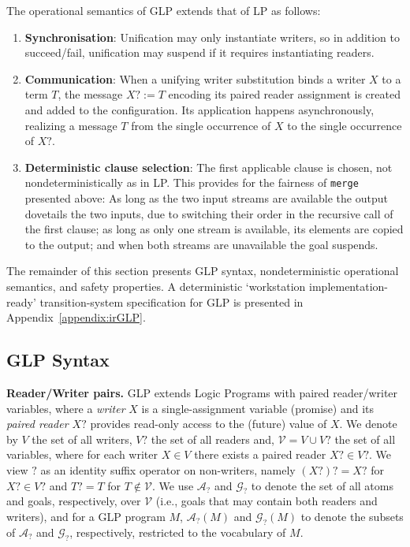 \documentclass[runningheads,thm-restate]{llncs}
\newcommand{\mypara}[1]{\smallskip\noindent\textbf{#1.}}
\newcommand{\calV}{\mathcal{V}}
\newcommand{\calG}{\mathcal{G}}
\newcommand{\calA}{\mathcal{A}}
\begin{document}
The operational semantics of GLP extends that of LP as follows:
\begin{enumerate}
\item \textbf{Synchronisation}: Unification may only instantiate writers, so in addition to succeed/fail, unification may suspend if it requires instantiating readers.

\item \textbf{Communication}: When a unifying writer substitution binds a writer $X$ to a term $T$, the message  $X? := T$ encoding its paired reader assignment is created and added to the configuration. Its application happens asynchronously, realizing a message $T$ from the single occurrence of $X$ to the single occurrence of $X?$. 

\item \textbf{Deterministic clause selection}: The first applicable clause is chosen, not nondeterministically as in LP. This provides for the fairness of \verb|merge| presented above:  As long as the two input streams are available the output dovetails the two inputs, due to switching their order in the recursive call of the first clause; as long as only one stream is available, its elements are copied to the output; and when both streams are unavailable the goal suspends.
\end{enumerate}

The remainder of this section presents GLP syntax, nondeterministic operational semantics, and safety properties. A deterministic `workstation implementation-ready' transition-system specification for GLP is presented in Appendix~\ref{appendix:irGLP}. 

\subsection{GLP Syntax}

\mypara{Reader/Writer pairs}
GLP extends Logic Programs with paired reader/writer variables, where a \emph{writer} $X$ is a single-assignment variable (promise) and its \emph{paired reader $X?$} provides read-only access to the (future) value of $X$. We denote by $V$ the set of all writers, $V?$ the set of all readers and, $\mathcal{V} = V \cup V?$ the set of all variables, where for each writer $X \in V$ there exists a paired reader $X? \in V?$.  
We view $?$ as an identity suffix operator on non-writers, namely  $(X?)?=X?$ for $X?\in V?$ and $T?=T$ for $T\notin \calV$. 
We use $\calA_?$ and $\calG_?$ to denote the set of all atoms and goals, respectively, over $\calV$ (i.e., goals that may contain both readers and writers), and for a GLP program $M$,  $\calA_?(M)$  and $\calG_?(M)$ to denote the subsets of  $\calA_?$ and $\calG_?$, respectively,  restricted to the vocabulary of $M$.
\end{document}
